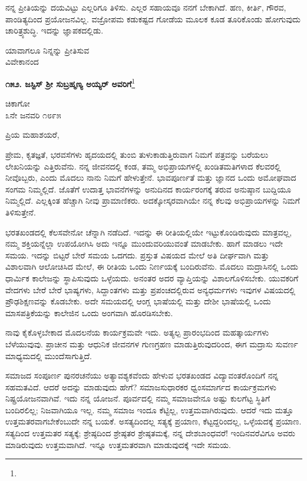 ನನ್ನ ಪ್ರೀತಿಯನ್ನು ದಯವಿಟ್ಟು ಎಲ್ಲರಿಗೂ ತಿಳಿಸು. ಎಲ್ಲರ ಸಹಾಯವೂ ನನಗೆ ಬೇಕಾಗಿದೆ. ಹಣ, ಕೀರ್ತಿ, ಗೌರವ, ಪಾಂಡಿತ್ಯದಿಂದ ಪ್ರಯೋಜನವಿಲ್ಲ. ವಜ್ರೋಪಮ ಕಡುಕಷ್ಟದ ಗೋಡೆಯ ಮೂಲಕ ಕೂಡ ತೂರಿಕೊಂಡು ಹೋಗುವುದು ಚಾರಿತ್ರ್ಯಶುದ್ಧಿ. ಇದನ್ನು ಜ್ಞಾಪಕದಲ್ಲಿಡು.

{\flushright
ಯಾವಾಗಲೂ ನಿನ್ನನ್ನು ಪ್ರೀತಿಸುವ\\ವಿವೇಕಾನಂದ\par}

\begin{center}
\textbf{೧೫೨. ಜಸ್ಟಿಸ್ ಶ‍್ರೀ ಸುಬ್ರಹ್ಮಣ್ಯ ಅಯ್ಯರ್ ಅವರಿಗೆ}\footnote{}
\end{center}

\begin{flushright}
ಚಿಕಾಗೋ\\೩ನೇ ಜನವರಿ ೧೮೯೫
\end{flushright}

\noindent
ಪ್ರಿಯ ಮಹಾಶಯರೆ,

ಪ್ರೇಮ, ಕೃತಜ್ಞತೆ, ಭರವಸೆಗಳು ಹೃದಯದಲ್ಲಿ ತುಂಬಿ ತುಳುಕಾಡುತ್ತಿರುವಾಗ ನಿಮಗೆ ಪತ್ರವನ್ನು ಬರೆಯಲು ಲೇಖನಿಯನ್ನು ಎತ್ತಿರುವೆನು. ನನ್ನ ಜೀವನದಲ್ಲಿ ಕಂಡ, ತಮ್ಮ ಅಭಿಪ್ರಾಯಗಳಲ್ಲಿ ಖಂಡಿತಮತಿಗಳಾದ ಕೆಲವರಲ್ಲಿ ನೀವೊಬ್ಬರು, ಎಂದು ಮೊದಲು ನಾನು ನಿಮಗೆ ಹೇಳುತ್ತೇನೆ. ಭಾವಪೂರ್ಣತೆ ಮತ್ತು ಜ್ಞಾನದ ಒಂದು ಅಮೋಘವಾದ ಸಂಗಮ ನಿಮ್ಮಲ್ಲಿದೆ. ಜೊತೆಗೆ ಉದಾತ್ತ ಭಾವನೆಗಳನ್ನು ಅನುದಿನದ ಕಾರ್ಯರಂಗಕ್ಕೆ ತರುವ ಅನುಷ್ಠಾನ ಬುದ್ದಿಯೂ ನಿಮ್ಮಲ್ಲಿದೆ. ಎಲ್ಲಕ್ಕಿಂತ ಹೆಚ್ಚಾಗಿ ನೀವು ಪ್ರಾಮಾಣಿಕರು. ಅದಕ್ಕೋಸ್ಕರವಾಗಿಯೇ ನನ್ನ ಕೆಲವು ಅಭಿಪ್ರಾಯಗಳನ್ನು ನಿಮಗೆ ತಿಳಿಸುತ್ತೇನೆ.

ಭರತಖಂಡದಲ್ಲಿ ಕೆಲಸವೇನೋ ಚೆನ್ನಾಗಿ ನಡೆದಿದೆ. ಇದನ್ನು ಈ ರೀತಿಯಲ್ಲಿಯೇ ಇಟ್ಟುಕೊಂಡಿರುವುದು ಮಾತ್ರವಲ್ಲ, ನಮ್ಮ ಶಕ್ತಿಯನ್ನೆಲ್ಲಾ ಉಪಯೋಗಿಸಿ ಅದು ಇನ್ನೂ ಮುಂದುವರಿಯುವಂತೆ ಮಾಡಬೇಕು. ಹಾಗೆ ಮಾಡಲು ಇದೇ ಸಮಯ. ಇದನ್ನು ಬಿಟ್ಟರೆ ಬೇರೆ ಸಮಯ ಒದಗದು. ಪ್ರಸ್ತುತ ವಿಷಯದ ಮೇಲೆ ಅತಿ ದೀರ್ಘವಾಗಿ ಮತ್ತು ವಿಶಾಲವಾಗಿ ಆಲೋಚಿಸಿದ ಮೇಲೆ, ಈ ರೀತಿಯ ಒಂದು ನಿರ್ಣಯಕ್ಕೆ ಬಂದಿರುವೆನು. ಮೊದಲು ಮದ್ರಾಸಿನಲ್ಲಿ ಒಂದು ಧಾರ್ಮಿಕ ಕಾಲೇಜನ್ನು ಸ್ಥಾಪಿಸುವುದು ಒಳ್ಳೆಯದು. ಅನಂತರ ಅದರ ವ್ಯಾಪ್ತಿಯನ್ನು ವಿಶಾಲಗೊಳಿಸಬೇಕು. ಯುವಕರಿಗೆ ವೇದಗಳು ಬೇರೆ ಬೇರೆ ಭಾಷ್ಯಗಳು, ಸಿದ್ದಾಂತಗಳು ಮತ್ತು ಪ್ರಪಂಚದಲ್ಲಿರುವ ಅನ್ಯಧರ್ಮಗಳು\enginline{-} ಇವುಗಳ ವಿಷಯದಲ್ಲಿ ಪ್ರೌಢಶಿಕ್ಷಣವನ್ನು ಕೊಡಬೇಕು. ಅದೇ ಸಮಯದಲ್ಲಿ ಆಂಗ್ಲ ಭಾಷೆಯಲ್ಲಿ ಮತ್ತು ದೇಶೀ ಭಾಷೆಯಲ್ಲಿ ಒಂದು ಮಾಸಪತ್ರಿಕೆಯನ್ನು ಕಾಲೇಜಿನ ಒಂದು ಅಂಗವಾಗಿ ಹೊರಡಿಸಬೇಕು.

ನಾವು ಕೈಕೊಳ್ಳಬೇಕಾದ ಮೊದಲನೆಯ ಕಾರ್ಯಕ್ರಮವೇ ಇದು. ಅತ್ಯಲ್ಪ ಪ್ರಾರಂಭದಿಂದ ಮಹತ್ಕಾರ್ಯಗಳು ಬೆಳೆಯುವುವು. ಪ್ರಾಚೀನ ಮತ್ತು ಆಧುನಿಕ ಜೀವನಗಳ ಗುಣಗ್ರಹಣ ಮಾಡುತ್ತಿರುವುದರಿಂದ, ಈಗ ಮದ್ರಾಸು ಸುವರ್ಣ ಮಾಧ್ಯಮದಲ್ಲಿ ಮುಂದೆಸಾಗುತ್ತಿದೆ.

ಸಮಾಜದ ಸಂಪೂರ್ಣ ಪುನರಚನೆಯು ಅತ್ಯಾವಶ್ಯಕವೆಂದು ಹೇಳುವ ಭರತಖಂಡದ ವಿದ್ಯಾವಂತರೊಂದಿಗೆ ನನ್ನ ಸಹಮತವಿದೆ. ಆದರೆ ಅದನ್ನು ಮಾಡುವುದು ಹೇಗೆ? ಸಮಾಜಸುಧಾರಕರ ಧ್ವಂಸಮಾರ್ಗದ ಕಾರ್ಯಕ್ರಮಗಳು ನಿಷ್ಪ್ರಯೋಜನವಾಗಿವೆ. ಇದು ನನ್ನ ಯೋಜನೆ. ಪೂರ್ವದಲ್ಲಿ ನಮ್ಮ ಸಮಾಜವೇನೂ ಅಷ್ಟು ಕುಲಗೆಟ್ಟ ಸ್ಥಿತಿಗೆ ಬಂದಿರಲಿಲ್ಲ; ನಿಜವಾಗಿಯೂ ಇಲ್ಲ. ನಮ್ಮ ಸಮಾಜ ಇಂದೂ ಕೆಟ್ಟಿಲ್ಲ, ಉತ್ತಮವಾಗಿರುವುದು. ಆದರೆ ಇದು ಮತ್ತೂ ಉತ್ತಮತರವಾಗಬೇಕೆಂಬುದೇ ನನ್ನ ಬಯಕೆ. ಅಸತ್ಯದಿಂದಲ್ಲ ಸತ್ಯಕ್ಕೆ ಪ್ರಯಾಣ, ಕೆಟ್ಟದ್ದರಿಂದಲ್ಲ, ಒಳ್ಳೆಯದಕ್ಕೆ ಪ್ರಯಾಣ. ಸತ್ಯದಿಂದ ಉತ್ತಮತರ ಸತ್ಯಕ್ಕೆ; ಶ್ರೇಷ್ಠದಿಂದ ಶ್ರೇಷ್ಠತರ ಶ್ರೇಷ್ಠತಮಕ್ಕೆ, ನನ್ನ ದೇಶಬಾಂಧವರೆ! ಇಂದಿನವರೆವಿಗೂ ಅವರು ಮಾಡಿರುವುದು ಉತ್ತಮವಾಗಿದೆ. ಇನ್ನೂ ಉತ್ತಮತರವಾಗಿ ಮಾಡುವುದಕ್ಕೆ ಇದೇ ಸಮಯ.

